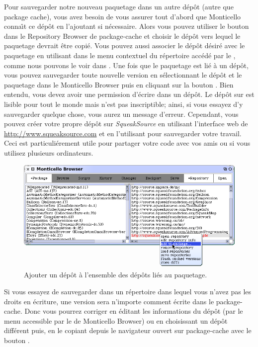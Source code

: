 \documentclass[a4paper,10pt,twoside]{book}
\begin{document}
Pour sauvegarder notre nouveau paquetage dans un autre
d\'ep\^ot (autre que package cache), vous
avez besoin de vous assurer tout d'abord que Monticello conna\^{\i}t
ce d\'ep\^ot en l'ajoutant si n\'ecessaire.
Alors vous pouvez utiliser le bouton  dans le 
Repository Browser de package-cache et choisir le d\'ep\^ot vers lequel
le paquetage devrait \^etre copi\'e.
Vous pouvez aussi associer le d\'ep\^ot d\'esir\'e avec le paquetage
en utilisant  
dans le menu contextuel du r\'epertoire acc\'ed\'e par le , comme
nous pouvons le voir dans .
Une fois que le paquetage est li\'e \`a un d\'ep\^ot, vous pouvez sauvegarder
toute nouvelle version en s\'electionnant le d\'ep\^ot et le paquetage
dans le Monticello Browser puis en cliquant sur la bouton 
 .  
Bien entendu, vous devez avoir une permission d'\'ecrire dans un d\'ep\^ot.
Le d\'ep\^ot  sur  est
lisible pour tout le monde mais n'est pas inscriptible; ainsi, si vous
essayez d'y sauvegarder quelque chose, vous aurez un message d'erreur.
Cependant, vous pouvez cr\'eer votre propre d\'ep\^ot sur 
\emph{SqueakSource} en utilisant l'interface web de \url{http://www.squeaksource.com} et en l'utilisant pour sauvegarder votre travail.
Ceci est particuli\'erement utile pour partager votre code avec vos amis ou
si vous utilisez plusieurs ordinateurs.

\begin{figure}[tbp]
	\begin{center}
		\includegraphics[width=\textwidth]{MCaddToPackage}
	\end{center}
	\caption{Ajouter un d\'ep\^ot \`a l'ensemble des d\'ep\^ots li\'es
au paquetage.}
	\label{fig:associateRepository}
\end{figure}

Si vous essayez de sauvegarder dans un r\'epertoire dans lequel vous n'avez
pas les droits en \'ecriture, une version sera n'importe comment \'ecrite
dans le package-cache.
Donc vous pourrez corriger en \'editant les informations du d\'ep\^ot
(par le menu accessible par le  de Monticello Browser) ou
en choisissant un d\'ep\^ot diff\'erent puis, en le copiant
depuis le navigateur ouvert sur package-cache avec le bouton .
\end{document}

